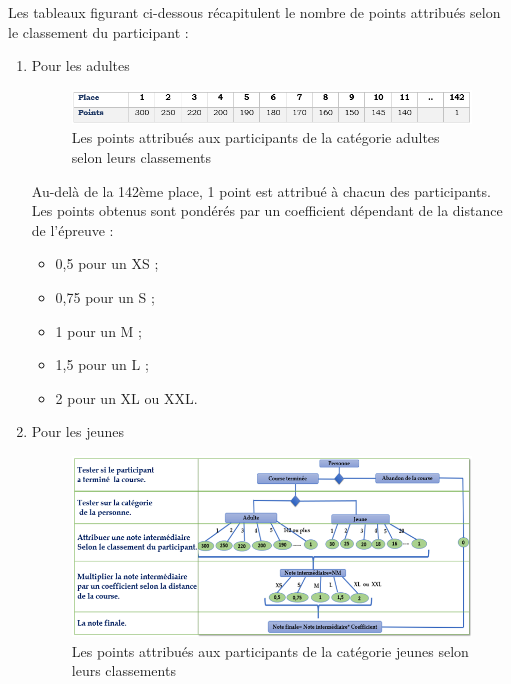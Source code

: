 	Les tableaux figurant ci-dessous récapitulent le nombre de points attribués selon le classement du participant :
	\begin{enumerate}
	   \item Pour les adultes
	\begin{figure}[h!]
	   \center
	   \includegraphics[scale=1]{img/points_categorie_adultes.png}
	   \caption {Les points attribués aux participants de la catégorie adultes selon leurs classements}
	\end{figure}
	
	Au-delà de la 142ème place, 1 point est attribué à chacun des participants. Les points obtenus sont pondérés par un coefficient dépendant de la distance de l’épreuve : 
	
	\begin{itemize} 
	 	\item 0,5 pour un XS ; 
	 	\item 0,75 pour un S ;
	 	\item 1 pour un M ;  
	 	\item 1,5 pour un L ;
	 	\item 2 pour un XL ou XXL.
	\end{itemize} 
	   \item Pour les jeunes
	\begin{figure}[!h]
	   \center
	   \includegraphics[scale=0.9]{img/points_categorie_jeunes.png}
	   \caption {Les points attribués aux participants de la catégorie jeunes selon leurs classements}
	\end{figure}
	
	\end{enumerate}

